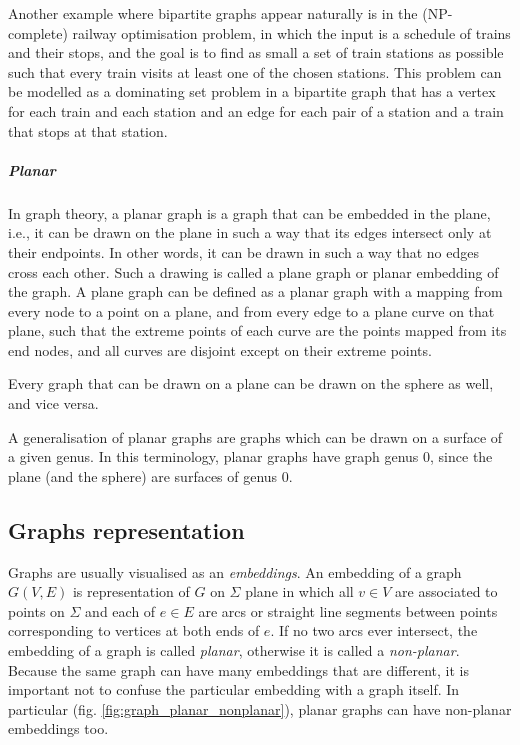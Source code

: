           Another example where bipartite graphs appear naturally is in the (NP-complete) railway optimisation problem, in which the input is a schedule of trains and their stops, and the goal is to find as small a set of train stations as possible such that every train visits at least one of the chosen stations. This problem can be modelled as a dominating set problem in a bipartite graph that has a vertex for each train and each station and an edge for each pair of a station and a train that stops at that station.\cite{Niedermeier2006}

        \subparagraph{Planar}
        
          In graph theory, a planar graph is a graph that can be embedded in the plane, i.e., it can be drawn on the plane in such a way that its edges intersect only at their endpoints. In other words, it can be drawn in such a way that no edges cross each other.\cite{Trudeau1993,Diestel2012} Such a drawing is called a plane graph or planar embedding of the graph. A plane graph can be defined as a planar graph with a mapping from every node to a point on a plane, and from every edge to a plane curve on that plane, such that the extreme points of each curve are the points mapped from its end nodes, and all curves are disjoint except on their extreme points.

          Every graph that can be drawn on a plane can be drawn on the sphere as well, and vice versa.

          A generalisation of planar graphs are graphs which can be drawn on a surface of a given genus. In this terminology, planar graphs have graph genus $0$, since the plane (and the sphere) are surfaces of genus $0$.

  \subsection{Graphs representation}

    Graphs are usually visualised as an \emph{embeddings}. An embedding of a graph $G(V, E)$ is representation of $G$ on $\Sigma$ plane in which all $v \in V$ are associated to points on $\Sigma$ and each of $e \in E$ are arcs or straight line segments between points corresponding to vertices at both ends of $e$. If no two arcs ever intersect, the embedding of a graph is called \emph{planar}, otherwise it is called a \emph{non-planar}. Because the same graph can have many embeddings that are different, it is important not to confuse the particular embedding with a graph itself. In particular (fig. \ref{fig:graph_planar_nonplanar}), planar graphs can have non-planar embeddings too.

